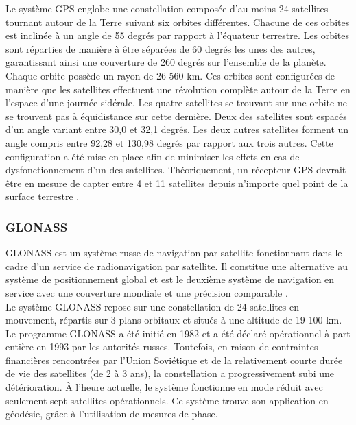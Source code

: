 Le système GPS englobe une constellation composée d'au moins 24 satellites tournant autour de la Terre suivant six orbites différentes. Chacune de ces orbites est inclinée à un angle de 55 degrés par rapport à l'équateur terrestre. Les orbites sont réparties de manière à être séparées de 60 degrés les unes des autres, garantissant ainsi une couverture de 260 degrés sur l'ensemble de la planète. Chaque orbite possède un rayon de 26 560 km. Ces orbites sont configurées de manière que les satellites effectuent une révolution complète autour de la Terre en l'espace d'une journée sidérale. Les quatre satellites se trouvant sur une orbite ne se trouvent pas à équidistance sur cette dernière. Deux des satellites sont espacés d'un angle variant entre 30,0 et 32,1 degrés. Les deux autres satellites forment un angle compris entre 92,28 et 130,98 degrés par rapport aux trois autres. Cette configuration a été mise en place afin de minimiser les effets en cas de dysfonctionnement d'un des satellites. Théoriquement, un récepteur GPS devrait être en mesure de capter entre 4 et 11 satellites depuis n'importe quel point de la surface terrestre \cite{frederic_evennou_techniques_2007}.

\subsubsection{GLONASS }
GLONASS est un système russe de navigation par satellite fonctionnant dans le cadre d'un service de radionavigation par satellite. Il constitue une alternative au système de positionnement global et est le deuxième système de navigation en service avec une couverture mondiale et une précision comparable \cite{bernhard_hofmann_wellenhof_gnss}.\\

Le système GLONASS repose sur une constellation de 24 satellites en mouvement, répartis sur 3 plans orbitaux et situés à une altitude de 19 100 km. Le programme GLONASS a été initié en 1982 et a été déclaré opérationnel à part entière en 1993 par les autorités russes. Toutefois, en raison de contraintes financières rencontrées par l'Union Soviétique et de la relativement courte durée de vie des satellites (de 2 à 3 ans), la constellation a progressivement subi une détérioration. À l'heure actuelle, le système fonctionne en mode réduit avec seulement sept satellites opérationnels. Ce système trouve son application en géodésie, grâce à l'utilisation de mesures de phase.\\

